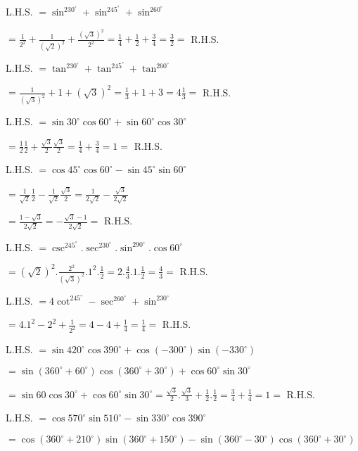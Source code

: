 \item L.H.S. $= \sin^230^\circ + \sin^245^\circ + \sin^260^\circ$

  $= \frac{1}{2^2} + \frac{1}{(\sqrt{2})^2} + \frac{(\sqrt{3})^2}{2^2} = \frac{1}{4} + \frac{1}{2} + \frac{3}{4} =
  \frac{3}{2} =$ R.H.S.

\item L.H.S. $= \tan^230^\circ + \tan^245^\circ + \tan^260^\circ$

  $= \frac{1}{(\sqrt{3})^2} + 1 + (\sqrt{3})^2 = \frac{1}{3} + 1 + 3 = 4\frac{1}{3} =$ R.H.S.

\item L.H.S. $= \sin 30^\circ\cos 60^\circ + \sin 60^\circ\cos 30^\circ$

  $= \frac{1}{2}\frac{1}{2} + \frac{\sqrt{3}}{2}\frac{\sqrt{3}}{2} = \frac{1}{4} + \frac{3}{4} = 1 =$ R.H.S.

\item L.H.S. $= \cos 45^\circ\cos 60^\circ - \sin 45^\circ\sin 60^\circ$

  $= \frac{1}{\sqrt{2}}\frac{1}{2} - \frac{1}{\sqrt{2}}\frac{\sqrt{3}}{2} = \frac{1}{2\sqrt{2}} - \frac{\sqrt{3}}{2\sqrt{2}}$

  $= \frac{1 - \sqrt{3}}{2\sqrt{2}} = - \frac{\sqrt{3} - 1}{2\sqrt{2}} =$ R.H.S.

\item L.H.S. $= \csc^245^\circ.\sec^230^\circ.\sin^290^\circ.\cos 60^\circ$

  $= (\sqrt{2})^2.\frac{2^2}{(\sqrt{3})^2}.1^2.\frac{1}{2} = 2.\frac{4}{3}.1.\frac{1}{2} = \frac{4}{3} =$ R.H.S.

\item L.H.S. $= 4\cot^245^\circ-\sec^260^\circ + \sin^230^\circ$

  $= 4.1^2 - 2^2 + \frac{1}{2^2} = 4 - 4 + \frac{1}{4} = \frac{1}{4} =$ R.H.S.

\item L.H.S. $= \sin 420^\circ\cos 390^\circ + \cos(-300^\circ)\sin(-330^\circ)$

  $= \sin(360^\circ + 60^\circ)\cos(360^\circ + 30^\circ) + \cos 60^\circ\sin30^\circ$

  $= \sin 60\cos30^\circ + \cos 60^\circ\sin30^\circ = \frac{\sqrt{3}}{2}.\frac{\sqrt{3}}{3} + \frac{1}{2}.\frac{1}{2} =
  \frac{3}{4} + \frac{1}{4} = 1 =$ R.H.S.

\item L.H.S. $= \cos 570^\circ\sin 510^\circ -\sin 330^\circ\cos 390^\circ$

  $= \cos(360^\circ + 210^\circ)\sin(360^\circ + 150^\circ) - \sin(360^\circ - 30^\circ)\cos(360^\circ + 30^\circ)$

